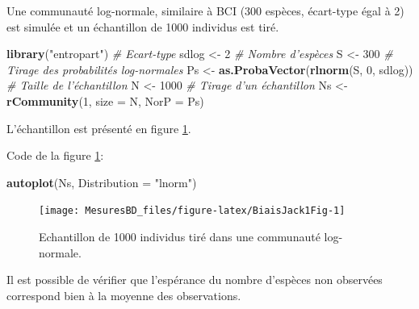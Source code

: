 \documentclass[
  11pt,
  french,
  a4paper,
  extrafontsizes,onecolumn,openright
  ]{memoir}
\newenvironment{Shaded}{\begin{snugshade}}{\end{snugshade}}
\newcommand{\CommentTok}[1]{\textcolor[rgb]{0.56,0.35,0.01}{\textit{#1}}}
\newcommand{\DataTypeTok}[1]{\textcolor[rgb]{0.13,0.29,0.53}{#1}}
\newcommand{\DecValTok}[1]{\textcolor[rgb]{0.00,0.00,0.81}{#1}}
\newcommand{\KeywordTok}[1]{\textcolor[rgb]{0.13,0.29,0.53}{\textbf{#1}}}
\newcommand{\NormalTok}[1]{#1}
\newcommand{\StringTok}[1]{\textcolor[rgb]{0.31,0.60,0.02}{#1}}
\begin{document}
Une communauté log-normale, similaire à BCI (300 espèces, écart-type égal à 2) est simulée et un échantillon de 1000 individus est tiré.

\scriptsize

\begin{Shaded}
\begin{Highlighting}[]
\KeywordTok{library}\NormalTok{(}\StringTok{"entropart"}\NormalTok{)}
\CommentTok{# Ecart-type}
\NormalTok{sdlog <-}\StringTok{ }\DecValTok{2}
\CommentTok{# Nombre d'espèces}
\NormalTok{S <-}\StringTok{ }\DecValTok{300}
\CommentTok{# Tirage des probabilités log-normales}
\NormalTok{Ps <-}\StringTok{ }\KeywordTok{as.ProbaVector}\NormalTok{(}\KeywordTok{rlnorm}\NormalTok{(S, }\DecValTok{0}\NormalTok{, sdlog))}
\CommentTok{# Taille de l'échantillon}
\NormalTok{N <-}\StringTok{ }\DecValTok{1000}
\CommentTok{# Tirage d'un échantillon}
\NormalTok{Ns <-}\StringTok{ }\KeywordTok{rCommunity}\NormalTok{(}\DecValTok{1}\NormalTok{, }\DataTypeTok{size =}\NormalTok{ N, }\DataTypeTok{NorP =}\NormalTok{ Ps)}
\end{Highlighting}
\end{Shaded}

\normalsize

L'échantillon est présenté en figure \ref{fig:BiaisJack1Fig}.

Code de la figure \ref{fig:BiaisJack1Fig}:

\scriptsize

\begin{Shaded}
\begin{Highlighting}[]
\KeywordTok{autoplot}\NormalTok{(Ns, }\DataTypeTok{Distribution =} \StringTok{"lnorm"}\NormalTok{)}
\end{Highlighting}
\end{Shaded}

\normalsize

\scriptsize

\begin{figure}

{\centering \texttt{[image: MesuresBD\_files/figure-latex/BiaisJack1Fig-1]} 

}

\caption{Echantillon de 1000 individus tiré dans une communauté log-normale.}\label{fig:BiaisJack1Fig}
\end{figure}

\normalsize

Il est possible de vérifier que l'espérance du nombre d'espèces non observées correspond bien à la moyenne des observations.
\end{document}

